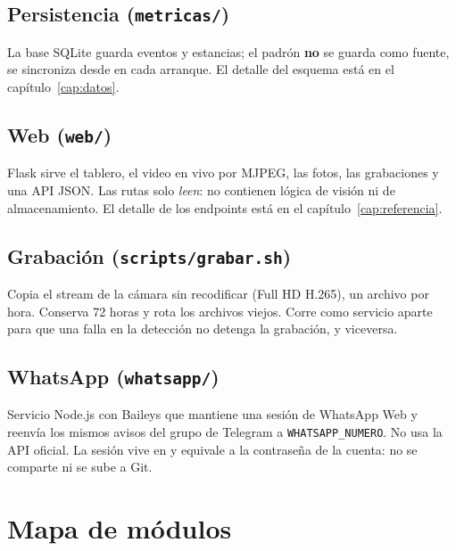\subsection{Persistencia (\texttt{metricas/})}

La base SQLite guarda eventos y estancias; el padrón \textbf{no} se guarda como
fuente, se sincroniza desde  en cada arranque. El detalle del
esquema está en el capítulo~\ref{cap:datos}.

\subsection{Web (\texttt{web/})}

Flask sirve el tablero, el video en vivo por MJPEG, las fotos, las grabaciones y
una API JSON. Las rutas solo \emph{leen}: no contienen lógica de visión ni de
almacenamiento. El detalle de los endpoints está en el
capítulo~\ref{cap:referencia}.

\subsection{Grabación (\texttt{scripts/grabar.sh})}

Copia el stream de la cámara sin recodificar (Full HD H.265), un archivo por
hora. Conserva 72 horas y rota los archivos viejos. Corre como servicio aparte
para que una falla en la detección no detenga la grabación, y viceversa.

\subsection{WhatsApp (\texttt{whatsapp/})}

Servicio Node.js con Baileys que mantiene una sesión de WhatsApp Web y reenvía
los mismos avisos del grupo de Telegram a \texttt{WHATSAPP\_NUMERO}. No usa la
API oficial. La sesión vive en  y equivale a la
contraseña de la cuenta: no se comparte ni se sube a Git.

\section{Mapa de módulos}

